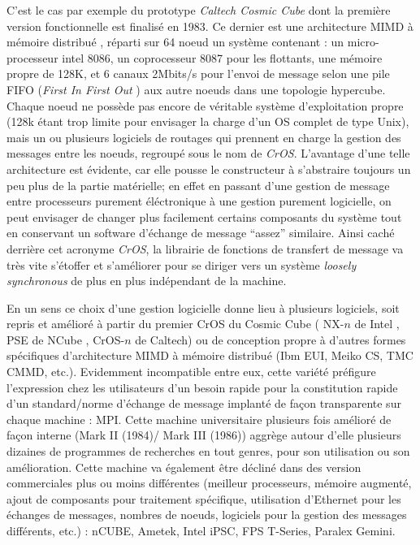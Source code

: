 C'est le cas par exemple du prototype \textit{Caltech Cosmic Cube} dont la première version fonctionnelle est finalisé en 1983. Ce dernier est une architecture MIMD à mémoire distribué , réparti sur 64 noeud un système contenant : un micro-processeur intel 8086, un coprocesseur 8087 pour les flottants, une mémoire propre de 128K, et 6 canaux 2Mbits/s pour l'envoi de message selon une pile FIFO (\textit{First In First Out} ) aux autre noeuds dans une topologie hypercube. Chaque noeud ne possède pas encore de véritable système d'exploitation propre (128k étant trop limite pour envisager la charge d'un OS complet de type Unix), mais un ou plusieurs logiciels de routages qui prennent en charge la gestion des messages entre les noeuds, regroupé sous le nom de \textit{CrOS}. L'avantage d'une telle architecture est évidente, car elle pousse le constructeur à s'abstraire toujours un peu plus de la partie matérielle; en effet en passant d'une gestion de message entre processeurs purement éléctronique à une gestion purement logicielle, on peut envisager de changer plus facilement certains composants du système tout en conservant un software d'échange de message \enquote{assez} similaire. Ainsi caché derrière cet acronyme \textit{CrOS}, la librairie de fonctions de transfert de message va très vite s'étoffer et s'améliorer pour se diriger vers un système \textit{loosely synchronous}  de plus en plus indépendant de la machine.  %

En un sens ce choix d'une gestion logicielle donne lieu à plusieurs logiciels, soit repris et amélioré à partir du premier CrOS du Cosmic Cube ( NX-$n$ de Intel , PSE de NCube , CrOS-$n$ de Caltech) ou de conception propre à d'autres formes spécifiques d'architecture MIMD à mémoire distribué (Ibm EUI, Meiko CS, TMC CMMD, etc.). Evidemment incompatible entre eux, cette variété préfigure l'expression chez les utilisateurs d'un besoin rapide pour la constitution rapide d'un standard/norme d'échange de message implanté de façon transparente sur chaque machine : MPI. Cette machine universitaire plusieurs fois amélioré de façon interne (Mark II (1984)/ Mark III (1986)) aggrège autour d'elle plusieurs dizaines de programmes de recherches en tout genres, pour son utilisation ou son amélioration. Cette machine va également être décliné dans des version commerciales plus ou moins différentes (meilleur processeurs, mémoire augmenté, ajout de composants pour traitement spécifique, utilisation d'Ethernet pour les échanges de messages, nombres de noeuds, logiciels pour la gestion des messages différents, etc.) : nCUBE, Ametek, Intel iPSC, FPS T-Series, Paralex Gemini.

